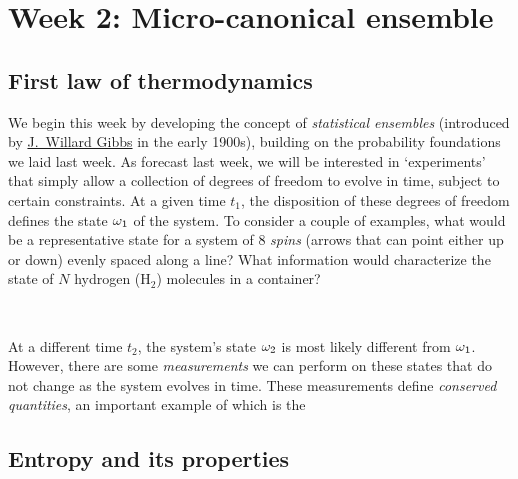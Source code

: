 \renewcommand{\thisweek}{MATH327 Week 2}
\renewcommand{\moddate}{Last modified 2 Feb.~2021}
\setcounter{section}{2}
\setcounter{subsection}{0}
{}
\section*{Week 2: Micro-canonical ensemble}

\subsection{First law of thermodynamics}
We begin this week by developing the concept of \textit{statistical ensembles} (introduced by \href{https://en.wikipedia.org/wiki/Josiah_Willard_Gibbs}{J.\ Willard Gibbs} in the early 1900s), building on the probability foundations we laid last week.
As forecast last week, we will be interested in `experiments' that simply allow a collection of degrees of freedom to evolve in time, subject to certain constraints.
At a given time $t_1$, the disposition of these degrees of freedom defines the state $\omega_1$ of the system.
To consider a couple of examples, what would be a representative state for a system of $8$ \textit{spins} (arrows that can point either up or down) evenly spaced along a line?
What information would characterize the state of $N$ hydrogen (H$_2$) molecules in a container?
\begin{mdframed}
  \ \\[100 pt]
\end{mdframed}

At a different time $t_2$, the system's state $\omega_2$ is most likely different from $\omega_1$.
However, there are some \textit{measurements} we can perform on these states that do not change as the system evolves in time.
These measurements define \textit{conserved quantities}, an important example of which is the 




\newpage %
\subsection{Entropy and its properties}



